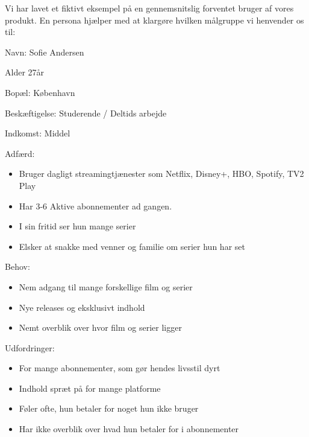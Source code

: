Vi har lavet et fiktivt eksempel på en gennemsnitslig forventet bruger af vores produkt. En persona hjælper med at klargøre hvilken målgruppe vi henvender os til:
\newpage

Navn: Sofie Andersen

Alder 27år

Bopæl: København

Beskæftigelse: Studerende / Deltids arbejde

Indkomst: Middel

Adfærd:
\begin{itemize}
    \item Bruger dagligt streamingtjænester som Netflix, Disney+, HBO, Spotify, TV2 Play
    \item Har 3-6 Aktive abonnementer ad gangen.
    \item I sin fritid ser hun mange serier
    \item Elsker at snakke med venner og familie om serier hun har set
\end{itemize}

Behov:
\begin{itemize}
    \item Nem adgang til mange forskellige film og serier
    \item Nye releases og eksklusivt indhold
    \item Nemt overblik over hvor film og serier ligger
\end{itemize}

Udfordringer:
\begin{itemize}
    \item For mange abonnementer, som gør hendes livsstil dyrt
    \item Indhold spræt på for mange platforme
    \item Føler ofte, hun betaler for noget hun ikke bruger
    \item Har ikke overblik over hvad hun betaler for i abonnementer
\end{itemize}

\newpage

